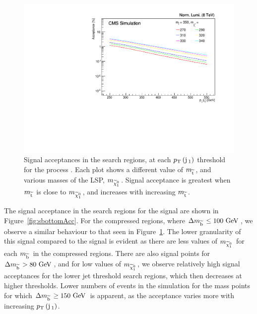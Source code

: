 \begin{figure}[ht!]
\begin{center}
  \includegraphics[scale=0.35]{Figures/sus13009/limitplots/plots/stop/acceptance_350.pdf}   
   
  \caption{Signal acceptances in the search regions, at each $p_{\text{T}}\,({\rm j}\,_1)$ threshold for the process \ttwocc. Each plot shows a different value of $m_{\widetilde{{\rm t}}\,}$, and various masses of the LSP, $m_{\widetilde{\chi}^{0}_{1}\,}$. Signal acceptance is greatest when $m_{\widetilde{{\rm t}}\,}$ is close to $m_{\widetilde{\chi}^{0}_{1}\,}$, and increases with increasing $m_{\widetilde{{\rm t}}\,}$.
\label{fig:stopAcc}}
  \end{center}
\end{figure}


The signal acceptance in the search regions for the \sBot signal are shown in Figure~\ref{fig:sbottomAcc}.
For the compressed regions, where $\Delta m_{\widetilde{{\rm b}}\,}\leq100~\mathrm{GeV}\,$, we observe a similar behaviour to that seen in Figure~\ref{fig:stopAcc}.
The lower granularity of this signal compared to the \ttwocc signal is evident as there are less values of $m_{\widetilde{\chi}^{0}_{1}\,}$ for each $m_{\widetilde{{\rm b}}\,}$ in the compressed regions. 
There are also signal points for $\Delta m_{\widetilde{{\rm b}}\,} > 80~\mathrm{GeV}\,$, and for low values of $m_{\widetilde{\chi}^{0}_{1}\,}$, we observe relatively high signal acceptances for the lower jet threshold search regions, which then decreases at higher thresholds.
Lower numbers of events in the simulation for the mass points for which $\Delta m_{\widetilde{{\rm b}}\,}\geq 150~\mathrm{GeV}\,$ is apparent, as the acceptance varies more with increasing $p_{\text{T}}\,({\rm j}\,_1)$.


